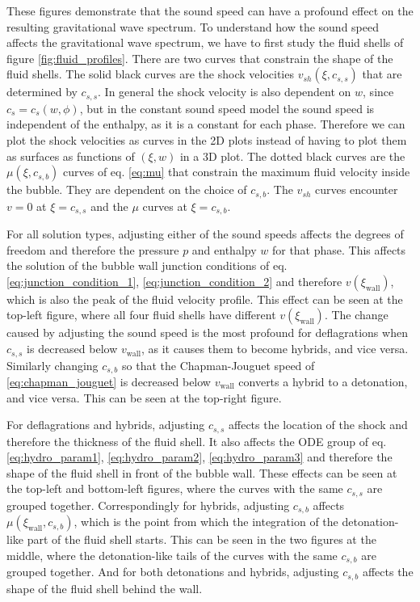 These figures demonstrate that the sound speed can have a profound effect on the resulting gravitational wave spectrum.
To understand how the sound speed affects the gravitational wave spectrum,
we have to first study the fluid shells of figure \ref{fig:fluid_profiles}.
There are two curves that constrain the shape of the fluid shells.
The solid black curves are the shock velocities $v_{sh}(\xi,c_{s,s})$ that are determined by $c_{s,s}$.
In general the shock velocity is also dependent on $w$, since $c_s = c_s(w,\phi)$,
but in the constant sound speed model the sound speed is independent of the enthalpy,
as it is a constant for each phase.
Therefore we can plot the shock velocities as curves in the 2D plots instead of having to plot them as surfaces as functions of $(\xi,w)$ in a 3D plot.
The dotted black curves are the $\mu(\xi,c_{s,b})$ curves of eq. \eqref{eq:mu} that constrain the maximum fluid velocity inside the bubble.
They are dependent on the choice of $c_{s,b}$.
The $v_{sh}$ curves encounter $v=0$ at $\xi = c_{s,s}$ and the $\mu$ curves at $\xi = c_{s,b}$.

For all solution types, adjusting either of the sound speeds affects the degrees of freedom and therefore the pressure $p$ and enthalpy $w$ for that phase.
This affects the solution of the bubble wall junction conditions of eq. \eqref{eq:junction_condition_1}, \eqref{eq:junction_condition_2} and therefore $v(\xi_\text{wall})$,
which is also the peak of the fluid velocity profile.
This effect can be seen at the top-left figure, where all four fluid shells have different $v(\xi_\text{wall})$.
The change caused by adjusting the sound speed is the most profound for deflagrations when $c_{s,s}$ is decreased below $v_\text{wall}$, as it causes them to become hybrids, and vice versa.
Similarly changing $c_{s,b}$ so that the Chapman-Jouguet speed of \eqref{eq:chapman_jouguet} is decreased below $v_\text{wall}$ converts a hybrid to a detonation, and vice versa.
This can be seen at the top-right figure.

For deflagrations and hybrids, adjusting $c_{s,s}$ affects the location of the shock and therefore the thickness of the fluid shell.
It also affects the ODE group of eq. \eqref{eq:hydro_param1}, \eqref{eq:hydro_param2}, \eqref{eq:hydro_param3} and therefore the shape of the fluid shell in front of the bubble wall.
These effects can be seen at the top-left and bottom-left figures, where the curves with the same $c_{s,s}$ are grouped together.
Correspondingly for hybrids, adjusting $c_{s,b}$ affects $\mu(\xi_\text{wall},c_{s,b})$,
which is the point from which the integration of the detonation-like part of the fluid shell starts.
This can be seen in the two figures at the middle, where the detonation-like tails of the curves with the same $c_{s,b}$ are grouped together.
And for both detonations and hybrids, adjusting $c_{s,b}$ affects the shape of the fluid shell behind the wall.

